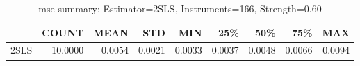 \begin{table}[ht]
\centering
\caption{mse summary: Estimator=2SLS, Instruments=166, Strength=0.60}
\begin{tabular}{lrrrrrrrr}
\toprule
 & COUNT & MEAN & STD & MIN & 25\% & 50\% & 75\% & MAX \\
\midrule
2SLS & 10.0000 & 0.0054 & 0.0021 & 0.0033 & 0.0037 & 0.0048 & 0.0066 & 0.0094 \\
\bottomrule
\end{tabular}
\end{table}
